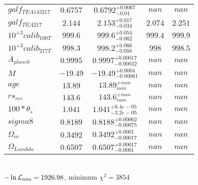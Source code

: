 \begin{tabular}{|l|c|c|c|c|}
$galf_{TE A 143 217 }$ &$0.6757$ & $0.6792_{-0.01}^{+0.0067}$ & $nan$ & $nan$ \\ 
$galf_{TE A 217 }$ &$2.144$ & $2.153_{-0.034}^{+0.017}$ & $2.074$ & $2.251$ \\ 
$10^{+3}calib_{100T }$ &$999.6$ & $999.6_{-0.062}^{+0.054}$ & $999.4$ & $999.9$ \\ 
$10^{+3}calib_{217T }$ &$998.3$ & $998.2_{-0.058}^{+0.066}$ & $998$ & $998.5$ \\ 
$A_{planck }$ &$0.9995$ & $0.9997_{-0.00032}^{+0.00017}$ & $nan$ & $nan$ \\ 
$M$ &$-19.49$ & $-19.49_{-0.00061}^{+0.0004}$ & $nan$ & $nan$ \\ 
$age$ &$13.89$ & $13.89_{nan}^{+nan}$ & $nan$ & $nan$ \\ 
$rs_{rec }$ &$143.6$ & $143.6_{nan}^{+nan}$ & $nan$ & $nan$ \\ 
$100*\theta{}_{s }$ &$1.041$ & $1.041_{-3.2e-05}^{+6.4e-05}$ & $nan$ & $nan$ \\ 
$sigma8$ &$0.8189$ & $0.8188_{-0.00075}^{+0.00062}$ & $nan$ & $nan$ \\ 
$\Omega{}_{m }$ &$0.3492$ & $0.3492_{-0.00017}^{+0.0001}$ & $nan$ & $nan$ \\ 
$\Omega{}_{Lambda }$ &$0.6507$ & $0.6507_{-0.0001}^{+0.00017}$ & $nan$ & $nan$ \\ 
\hline 
 \end{tabular} \\ 
$-\ln{\cal L}_\mathrm{min} =1926.98$, minimum $\chi^2=3854$ \\ 
